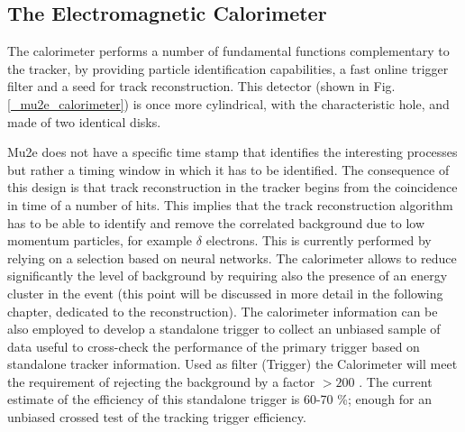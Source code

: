 \documentclass[12pt,a4paper,openright, oneside, titlepage]{book} %
\begin{document}
\subsection{The Electromagnetic Calorimeter}
The calorimeter performs a number of fundamental functions complementary to the tracker, by providing particle identification capabilities, a fast online trigger filter and a seed for track reconstruction.
This detector (shown in Fig. \ref{_mu2e_calorimeter}) is once more cylindrical, with the characteristic hole, and made of two identical disks.

\noindent
Mu2e does not have a specific time stamp that identifies the interesting processes but rather a timing window in which it has to be identified. 
The consequence of this design is that track reconstruction in the tracker begins from the coincidence in time of a number of hits. 
This implies that the track reconstruction algorithm has to be able to identify and remove the correlated background due to low momentum particles, for example $\delta$ electrons. 
This is currently performed by relying on a selection based on neural networks.
The calorimeter allows to reduce significantly the level of background by requiring also the presence of an energy cluster in the event (this point will be discussed in more detail in the following chapter, dedicated to the reconstruction).
The calorimeter information can be also employed to develop a standalone trigger to collect an unbiased sample of data useful to cross-check the performance of the primary trigger based on standalone tracker information.
Used as filter (Trigger) the Calorimeter will meet the requirement of rejecting the background by a factor $>200$ \cite{Calorimeter:2018}\cite{Donghia:2019}. The current estimate of the efficiency of this standalone trigger is 60-70 \%; enough for an unbiased crossed test of the tracking trigger efficiency.\\ 
\end{document}
